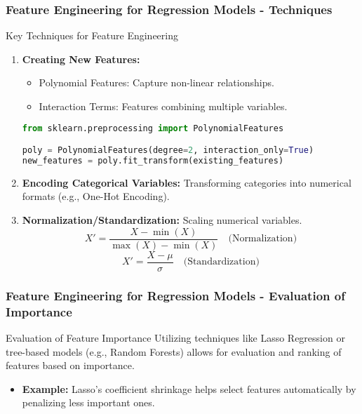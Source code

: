\documentclass[aspectratio=169]{beamer}
\begin{document}
\begin{frame}[fragile]
    \frametitle{Feature Engineering for Regression Models - Techniques}
    \begin{block}{Key Techniques for Feature Engineering}
        \begin{enumerate}
            \item \textbf{Creating New Features:}
                \begin{itemize}
                    \item Polynomial Features: Capture non-linear relationships.
                    \item Interaction Terms: Features combining multiple variables.
                \end{itemize}
                \begin{lstlisting}[language=Python]
from sklearn.preprocessing import PolynomialFeatures

poly = PolynomialFeatures(degree=2, interaction_only=True)
new_features = poly.fit_transform(existing_features)
                \end{lstlisting}

            \item \textbf{Encoding Categorical Variables:} Transforming categories into numerical formats (e.g., One-Hot Encoding).
            \item \textbf{Normalization/Standardization:} Scaling numerical variables.
                \begin{equation}
                X' = \frac{X - \min(X)}{\max(X) - \min(X)} \quad \text{(Normalization)}
                \end{equation}
                \begin{equation}
                X' = \frac{X - \mu}{\sigma} \quad \text{(Standardization)}
                \end{equation}
        \end{enumerate}
    \end{block}
\end{frame}

\begin{frame}[fragile]
    \frametitle{Feature Engineering for Regression Models - Evaluation of Importance}
    \begin{block}{Evaluation of Feature Importance}
        Utilizing techniques like Lasso Regression or tree-based models (e.g., Random Forests) allows for evaluation and ranking of features based on importance.
        \begin{itemize}
            \item \textbf{Example:} Lasso's coefficient shrinkage helps select features automatically by penalizing less important ones.
        \end{itemize}
    \end{block}
\end{frame}
\end{document}
